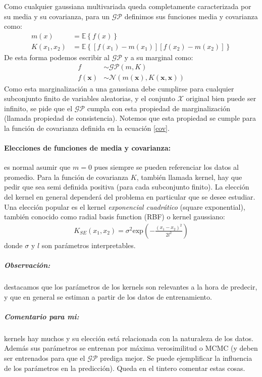 \documentclass[a4paper]{article}
\newcommand{\gp}{\ensuremath{\mathcal{GP}}}
\begin{document}
Como cualquier gaussiana multivariada queda completamente caracterizada por su media y su covarianza, para un $\gp$ definimos sus funciones media y covarianza como:
\begin{align}
	m(x) &= \mathbb{E}\left\{f(x)\right\}\\
	K(x_1,x_2) &= \mathbb{E}\left\{\left[f(x_1)-m(x_1)\right]\left[f(x_2)-m(x_2)\right]\right\} \label{cov}
\end{align}
De esta forma podemos escribir al $\gp$ y a su marginal como:
\begin{align}
	f &\sim \gp(m,K)\\
	f(\mathbf{x}) &\sim \mathcal{N}(m(\mathbf{x}), K(\mathbf{x},\mathbf{x}))
\end{align}
Como esta marginalización a una gaussiana debe cumplirse para cualquier subconjunto finito de variables aleatorias, y el conjunto $\mathcal{X}$ original bien puede ser infinito, se pide que el $\gp$ cumpla con esta propiedad de marginalización (llamada propiedad de consistencia). Notemos que esta propiedad se cumple para la función de covarianza definida en la ecuación \ref{cov}.

\paragraph{Elecciones de funciones de media y covarianza:} es normal asumir que $m=0$ pues siempre se pueden referenciar los datos al promedio. Para la función de covarianza $K$, también llamada kernel, hay que pedir que sea semi definida positiva (para cada subconjunto finito). La elección del kernel en general dependerá del problema en particular que se desee estudiar. Una elección popular es el kernel \emph{exponencial cuadrático} (square exponential), también conocido como radial basis function (RBF) o kernel gaussiano:
\begin{align}
	K_{SE}(x_1,x_2) = \sigma^2 \text{exp}\left(-\frac{(x_1-x_2)^2}{2l^2}\right) \label{covSE}
\end{align} 
donde $\sigma$ y $l$ son parámetros interpretables.

\subparagraph{Observación:} destacamos que los parámetros de los kernels son relevantes a la hora de predecir, y que en general se estiman a partir de los datos de entrenamiento.

\subparagraph{Comentario para mi:} kernels hay muchos y su elección está relacionada con la naturaleza de los datos. Además sus parámetros se entrenan por máxima verosimilitud o MCMC (y deben ser entrenados para que el $\gp$ prediga mejor. Se puede ejemplificar la influencia de los parámetros en la predicción). Queda en el tintero comentar estas cosas.
\end{document}
